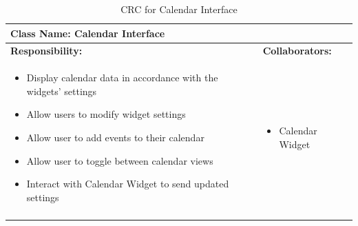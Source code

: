 \documentclass[]{article}
\begin{document}
\begin{longtable}{| p{} | p{} |}
	\hline
	\multicolumn{2}{|l|}{\textbf{Class Name: Calendar Interface}} \\
	\hline
	\textbf{Responsibility:} & \textbf{Collaborators:} \\
	\hline
	\begin{itemize}
		\item Display calendar data in accordance with the widgets' settings
		\item Allow users to modify widget settings
		\item Allow user to add events to their calendar
		\item Allow user to toggle between calendar views
		\item Interact with Calendar Widget to send updated settings
    \end{itemize} & 
	\begin{itemize}
		\item Calendar Widget
	\end{itemize} \\
	\hline
	\caption{CRC for Calendar Interface}
\end{longtable}
\end{document}
